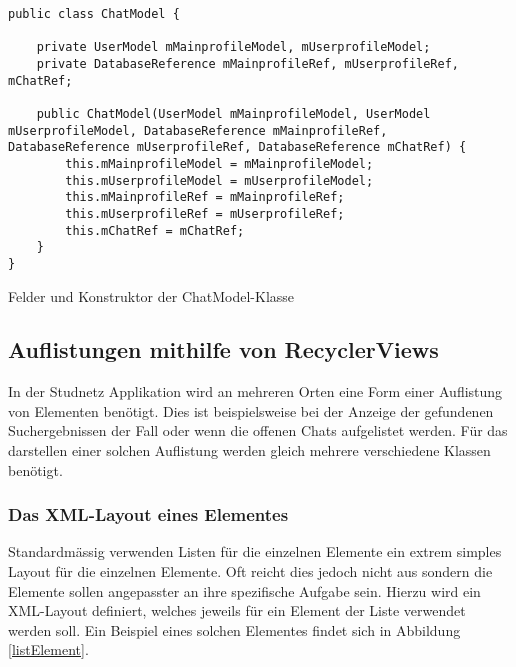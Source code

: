 \documentclass[../main.tex]{subfiles}
\begin{document}
\begin{code}
	\begin{center}
		\begin{verbatim}
public class ChatModel {

	private UserModel mMainprofileModel, mUserprofileModel;
	private DatabaseReference mMainprofileRef, mUserprofileRef, mChatRef;

	public ChatModel(UserModel mMainprofileModel, UserModel mUserprofileModel, DatabaseReference mMainprofileRef, DatabaseReference mUserprofileRef, DatabaseReference mChatRef) {
		this.mMainprofileModel = mMainprofileModel;
		this.mUserprofileModel = mUserprofileModel;
		this.mMainprofileRef = mMainprofileRef;
		this.mUserprofileRef = mUserprofileRef;
		this.mChatRef = mChatRef;
	}
}

		\end{verbatim}
		\caption{Felder und Konstruktor der ChatModel-Klasse}
		\label{chatModelConst}
	\end{center}
	
\end{code}
		
	\subsection{Auflistungen mithilfe von RecyclerViews}
	In der Studnetz Applikation wird an mehreren Orten eine Form einer Auflistung von Elementen benötigt. Dies ist beispielsweise bei der Anzeige der gefundenen Suchergebnissen der Fall oder wenn die offenen Chats aufgelistet werden. Für das darstellen einer solchen Auflistung werden gleich mehrere verschiedene Klassen benötigt.
	
	\subsubsection{Das XML-Layout eines Elementes}
	Standardmässig verwenden Listen für die einzelnen Elemente ein extrem simples Layout für die einzelnen Elemente. Oft reicht dies jedoch nicht aus sondern die Elemente sollen angepasster an ihre spezifische Aufgabe sein. Hierzu wird ein XML-Layout definiert, welches jeweils für ein Element der Liste verwendet werden soll. Ein Beispiel eines solchen Elementes findet sich in Abbildung \ref{listElement}.
\end{document}
